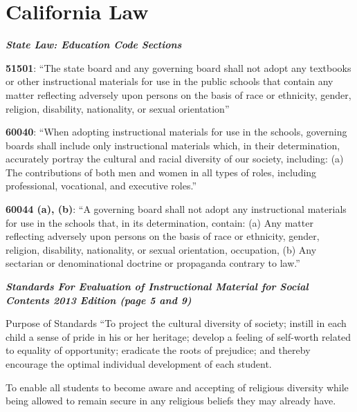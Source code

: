 \chapter{California Law}

\textit{\textbf{State Law: Education Code Sections}}

\textbf{51501}: “The state board and any governing board shall not adopt any textbooks or other instructional materials for use in the public schools that contain any matter reflecting adversely upon persons on the basis of race or ethnicity, gender, religion, disability, nationality, or sexual orientation”

\textbf{60040}: “When adopting instructional materials for use in the schools, governing boards shall include only instructional materials which, in their determination, accurately portray the cultural and racial diversity of our society, including: (a) The contributions of both men and women in all types of roles, including professional, vocational, and executive roles.”

\textbf{60044 (a), (b)}: “A governing board shall not adopt any instructional materials for use in the schools that, in its determination, contain: (a) Any matter reflecting adversely upon persons on the basis of race or ethnicity, gender, religion, disability, nationality, or sexual orientation, occupation, (b) Any sectarian or denominational doctrine or propaganda contrary to law.”

\textit{\textbf{Standards For Evaluation of Instructional Material for Social Contents 2013 Edition (page 5 and 9)}}

Purpose of Standards “To project the cultural diversity of society; instill in each child a sense of pride in his or her heritage; develop a feeling of self-worth related to equality of opportunity; eradicate the roots of prejudice; and thereby encourage the optimal individual development of each student.

To enable all students to become aware and accepting of religious diversity while being allowed to remain secure in any religious beliefs they may already have.

